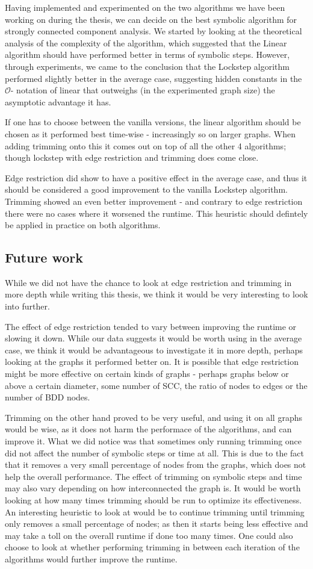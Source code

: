 \documentclass[../master/master.tex]{subfiles}
\begin{document}
Having implemented and experimented on the two algorithms we have been working on during the thesis, we can decide on the best symbolic algorithm for strongly connected component analysis. We started by looking at the theoretical analysis of the complexity of the algorithm, which suggested that the Linear algorithm should have performed better in terms of symbolic steps. However, through experiments, we came to the conclusion that the Lockstep algorithm performed slightly better in the average case, suggesting hidden constants in the $\mathcal{O}$- notation of linear that outweighs (in the experimented graph size) the asymptotic advantage it has.

If one has to choose between the vanilla versions, the linear algorithm should be chosen as it performed best time-wise - increasingly so on larger graphs. When adding trimming onto this it comes out on top of all the other 4 algorithms; though lockstep with edge restriction and trimming does come close.

Edge restriction did show to have a positive effect in the average case, and thus it should be considered a good improvement to the vanilla Lockstep algorithm. Trimming showed an even better improvement - and contrary to edge restriction there were no cases where it worsened the runtime. This heuristic should defintely be applied in practice on both algorithms.

\subsection{Future work}
While we did not have the chance to look at edge restriction and trimming in more depth while writing this thesis, we think it would be very interesting to look into further.

The effect of edge restriction tended to vary between improving the runtime or slowing it down. While our data suggests it would be worth using in the average case, we think it would be advantageous to investigate it in more depth, perhaps looking at the graphs it performed better on. It is possible that edge restriction might be more effective on certain kinds of graphs - perhaps graphs below or above a certain diameter, some number of SCC, the ratio of nodes to edges or the number of BDD nodes.

Trimming on the other hand proved to be very useful, and using it on all graphs would be wise, as it does not harm the performace of the algorithms, and can improve it. What we did notice was that sometimes only running trimming once did not affect the number of symbolic steps or time at all. This is due to the fact that it removes a very small percentage of nodes from the graphs, which does not help the overall performance. The effect of trimming on symbolic steps and time may also vary depending on how interconnected the graph is. It would be worth looking at how many times trimming should be run to optimize its effectiveness. An interesting heuristic to look at would be to continue trimming until trimming only removes a small percentage of nodes; as then it starts being less effective and may take a toll on the overall runtime if done too many times. One could also choose to look at whether performing trimming in between each iteration of the algorithms would further improve the runtime.
\end{document}
